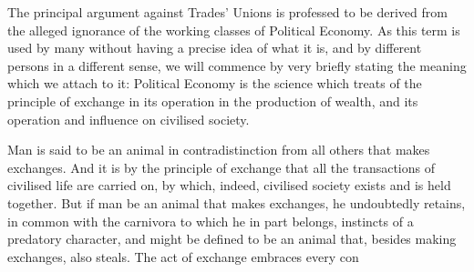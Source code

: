 \documentclass[12pt, a4paper]{article}
\begin{document}
    The principal argument against Trades' Unions is professed to be
    derived from the alleged ignorance of the working classes of Political
    Economy. As this term is used by many without having a precise
    idea of what it is, and by different persons in a different sense, we will
    commence by very briefly stating the meaning which we attach to
    it: Political Economy is the science which treats of the principle of exchange in its operation in the production of wealth, and its operation
    and influence on civilised society.

    Man is said to be an animal in contradistinction from all others
    that makes exchanges. And it is by the principle of exchange that all
    the transactions of civilised life are carried on, by which, indeed,
    civilised society exists and is held together. But if man be an animal
    that makes exchanges, he undoubtedly retains, in common with the
    carnivora to which he in part belongs, instincts of a predatory
    character, and might be defined to be an animal that, besides making
    exchanges, also steals. The act of exchange embraces every con
\end{document}
